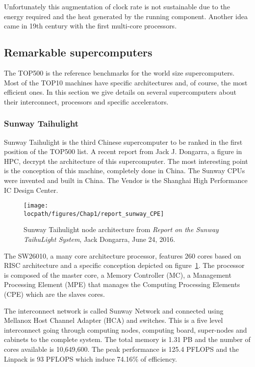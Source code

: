 Unfortunately this  augmentation of clock rate is not sustainable due to the energy required and the heat generated by the running component. 
Another idea came in 19th century with the first multi-core processors. 


\subsection{Remarkable supercomputers}
The TOP500 is the reference benchmarks for the world size supercomputers. 
Most of the TOP10 machines have specific architectures and, of course, the most efficient ones. 
In this section we give details on several supercomputers about their interconnect, processors and specific accelerators. 

\subsubsection{Sunway Taihulight}
Sunway Taihulight is the third Chinese supercomputer to be ranked in the first position of the TOP500 list. 
A recent report from Jack J. Dongarra, a figure in HPC, decrypt the architecture of this supercomputer\cite{dongarra2016report}. 
The most interesting point is the conception of this machine, completely done in China. 
The Sunway CPUs were invented and built in China. The Vendor is the Shanghai High Performance IC Design Center. 

\begin{figure}[t!]
\centering
\texttt{[image: \\locpath/figures/Chap1/report\_sunway\_CPE]}
\caption{Sunway Taihulight node architecture from \textit{Report on the Sunway TaihuLight System}, Jack Dongarra, June 24, 2016.}
\label{fig:chap1_report_sunway_CPE}
\end{figure}

The SW26010, a many core architecture processor, features 260 cores based on RISC architecture and a specific conception depicted on figure~\ref{fig:chap1_report_sunway_CPE}. 
The processor is composed of the master core, a Memory Controller (MC), a Management Processing Element (MPE) that manages the Computing Processing Elements (CPE) which are the slaves cores. 

The interconnect network is called Sunway Network and connected using Mellanox Host Channel Adapter (HCA) and switches. 
This is a five level interconnect going through computing nodes, computing board, super-nodes and cabinets to the complete system.
The total memory is 1.31 PB and the number of cores available is 10,649,600.
The peak performance is 125.4 PFLOPS and the Linpack is 93 PFLOPS which induce 74.16\% of efficiency. 

